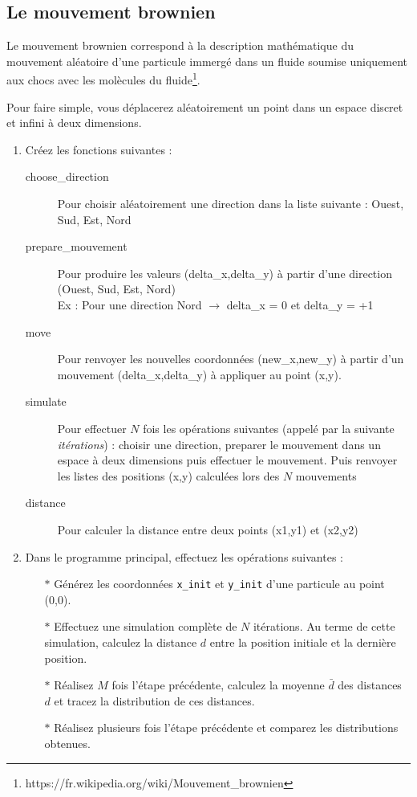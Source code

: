 \subsection{Le mouvement brownien}

Le  mouvement brownien  correspond  à la  description mathématique  du
mouvement  aléatoire d'une  particule immergé  dans un  fluide soumise
uniquement      aux     chocs      avec      les     molècules      du
fluide\footnote{https://fr.wikipedia.org/wiki/Mouvement\_brownien}.


Pour  faire simple,  vous déplacerez  aléatoirement un  point dans  un
espace discret et infini à deux dimensions.


\begin{enumerate}
\item Créez les fonctions suivantes :
  \begin{description}
  \item[choose\_direction]  Pour choisir  aléatoirement une  direction
    dans la liste suivante : Ouest, Sud, Est, Nord
  \item[prepare\_mouvement]     Pour      produire     les     valeurs
    (delta\_x,delta\_y)  à partir  d'une direction  (Ouest, Sud,  Est,
    Nord)\\ Ex : Pour une direction Nord $\rightarrow$ delta\_x = 0 et
    delta\_y = +1
  \item[move] Pour renvoyer  les nouvelles coordonnées (new\_x,new\_y)
    à partir  d'un mouvement (delta\_x,delta\_y) à  appliquer au point
    (x,y).
  \item[simulate]  Pour effectuer  $N$ fois  les opérations  suivantes
    (appelé  par  la  suivante   \textit{itérations})  :  choisir  une
    direction, preparer le mouvement dans  un espace à deux dimensions
    puis  effectuer  le  mouvement.   Puis  renvoyer  les  listes  des
    positions (x,y) calculées lors des $N$ mouvements
  \item[distance] Pour calculer la  distance entre deux points (x1,y1)
    et (x2,y2)
  \end{description}
\item Dans le programme  principal, effectuez les opérations suivantes
  :
  \begin{itemize}
  \item[$\ast$] Générez les coordonnées \texttt{x\_init} et \texttt{y\_init}
    d'une particule au point (0,0).
  \item[$\ast$]  Effectuez une simulation complète  de $N$ itérations. Au terme
    de cette  simulation, calculez la  distance $d$ entre  la position
    initiale et la dernière position.
  \item[$\ast$]   Réalisez $M$  fois  l'étape précédente,  calculez la  moyenne
    $\bar{d}$  des distances  $d$  et tracez  la  distribution de  ces
    distances.
  \item[$\ast$]   Réalisez plusieurs  fois l'étape  précédente et  comparez les
    distributions obtenues.
  \end{itemize}


\end{enumerate}


